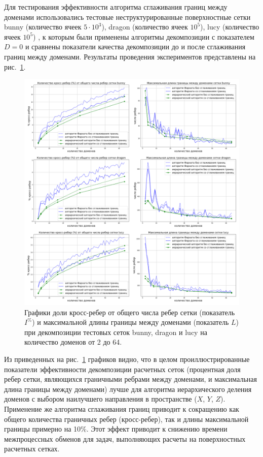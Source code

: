 Для тестирования эффективности алгоритма сглаживания границ между доменами использовались тестовые неструктурированные поверхностные сетки bunny (количество ячеек $5 \cdot 10^3$), dragon (количество ячеек $10^5$), lucy (количество ячеек $10^5$) \cite{StanfordModels}, к которым были применены алгоритмы декомпозиции с показателем $D = 0$ и сравнены показатели качества декомпозиции до и после сглаживания границ между доменами.
Результаты проведения экспериментов представлены на рис.~\ref{fig:text_2_smooth_graphics}.

\begin{figure}[H]
\centering
\includegraphics[width=1.0\textwidth]{fig/par_smooth_graphics.pdf}
\singlespacing
{}\caption{Графики доли кросс-ребер от общего числа ребер сетки (показатель $I^{\%}$) и максимальной длины границы между доменами (показатель $L$) при декомпозиции тестовых сеток bunny, dragon и lucy на количество доменов от 2 до 64.}
\label{fig:text_2_smooth_graphics}
\end{figure}

Из приведенных на рис.~\ref{fig:text_2_smooth_graphics} графиков видно, что в целом проиллюстрированные показатели эффективности декомпозиции расчетных сеток (процентная доля ребер сетки, являющихся граничными ребрами между доменами, и максимальная длина границы между доменами) лучше для алгоритма иерархического деления доменов с выбором наилучшего направления в пространстве ($X$, $Y$, $Z$).
Применение же алгоритма сглаживания границ приводит к сокращению как общего количества граничных ребер (кросс-ребер), так и длины максимальной границы примерно на 10\%.
Этот эффект приводит к снижению времени межпроцессных обменов для задач, выполняющих расчеты на поверхностных расчетных сетках.

